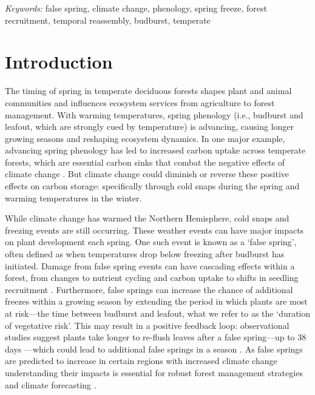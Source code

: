 \documentclass{article}\usepackage[]{graphicx}\usepackage[]{color}
\begin{document}
\vspace{2ex}
\textit{Keywords:} false spring, climate change, phenology, spring freeze, forest recruitment, temporal reassembly, budburst, temperate

\section*{Introduction}
The timing of spring in temperate deciduous forests shapes plant and animal communities and influences ecosystem services from agriculture to forest management. With warming temperatures, spring phenology (i.e., budburst and leafout, which are strongly cued by temperature) is advancing, causing longer growing seasons \citep{Chuine2001} and reshaping ecosystem dynamics. In one major example, advancing spring phenology has led to increased carbon uptake across temperate forests, which are essential carbon sinks that combat the negative effects of climate change \citep{Keenan2014}. But climate change could diminish or reverse these positive effects on carbon storage: specifically through cold snaps during the spring and warming temperatures in the winter.
  
While climate change has warmed the Northern Hemisphere, cold snaps and freezing events are still occurring. These weather events can have major impacts on plant development each spring. One such event is known as a `false spring', often defined as when temperatures drop below freezing \citep[][i.e., below -2.2$^{\circ}$C]{Schwartz2002} after budburst has initiated. Damage from false spring events can have cascading effects within a forest, from changes to nutrient cycling and carbon uptake to shifts in seedling recruitment \citep{Hufkens2012, Klosterman2018, Richardson2013}. Furthermore, false springs can increase the chance of additional freezes within a growing season by extending the period in which plants are most at risk---the time between budburst and leafout, what we refer to as the `duration of vegetative risk'. This may result in a positive feedback loop: observational studies suggest plants take longer to re-flush leaves after a false spring---up to 38 days \citep{Augspurger2009, Augspurger2013, Gu2008, Menzel2015}---which could lead to additional false springs in a season \citep{Augspurger2009}. As false springs are predicted to increase in certain regions with increased climate change \citep{Ault2015, Liu2018, Zohner2020} understanding their impacts is essential for robust forest management strategies and climate forecasting \citep{OBrien2019}. 
  
\end{document}
